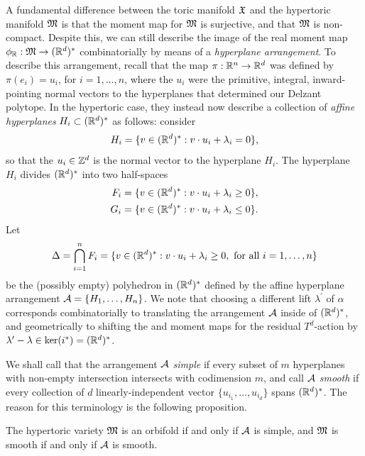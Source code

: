 A fundamental difference between the toric manifold $\mathfrak{X}$ and the hypertoric manifold $\mathfrak{M}$ is that the \HK moment map for $\mathfrak{M}$ is surjective, and that $\mathfrak{M}$ is non-compact. Despite this, we can still describe the image of the real moment map $\phi_{\mathbb{R}}:\mathfrak{M}\rightarrow (\mathbb{R}^{d})^{\ast}$ combinatorially by means of a \emph{hyperplane arrangement}. To describe this arrangement, recall that the map $\pi:\mathbb{R}^{n}\rightarrow \mathbb{R}^{d}$ was defined by $\pi(e_{i}) = u_{i}$, for $i = 1,\ldots, n$, where the $u_{i}$ were the primitive, integral, inward-pointing normal vectors to the hyperplanes that determined our Delzant polytope. In the hypertoric case, they instead now describe a collection of \emph{affine hyperplanes} $H_{i} \subset (\mathbb{R}^{d})^{\ast}$ as follows: consider
$$
	H_{i} = \{ v \in (\mathbb{R}^{d})^{\ast}: v \cdot u_{i} + \lambda_{i} = 0 \},
$$
so that the $u_{i} \in \mathbb{Z}^{d}$ is the normal vector to the hyperplane $H_{i}$. The hyperplane $H_{i}$ divides $(\mathbb{R}^{d})^{\ast}$ into two half-spaces
\begin{equation*}
	\begin{split}
		F_{i} &= \{v \in (\mathbb{R}^{d})^{\ast}: v \cdot u_{i} + \lambda_{i} \geq 0\},\\
		G_{i} &= \{v \in (\mathbb{R}^{d})^{\ast} : v \cdot u_{i} + \lambda_{i} \leq 0  \}.
	\end{split}
\end{equation*} 
Let
$$
	\Delta = \bigcap_{i=1}^{n}F_{i} = \{v \in (\mathbb{R}^{d})^{\ast} : v \cdot u_{i} + \lambda_{i} \geq 0, \text{ for all } i = 1,\ldots, n  \}
$$
be the (possibly empty) polyhedron in $(\mathbb{R}^{d})^{\ast}$ defined by the affine hyperplane arrangement $\mathcal{A} = \{H_{1},\ldots, H_{n}  \}$. We note that choosing a different lift $\lambda^{\prime}$ of $\alpha$ corresponds combinatorially to translating the arrangement $\mathcal{A}$ inside of $(\mathbb{R}^{d})^{\ast}$, and geometrically to shifting the \K and \HK moment maps for the residual $T^{d}$-action by $\lambda^{\prime} - \lambda \in \ker (i^{\ast}) = (\mathbb{R}^{d})^{\ast}$.

We shall call that the arrangement $\mathcal{A}$ \emph{simple} if every subset of $m$ hyperplanes with non-empty intersection intersects with codimension $m$, and call $\mathcal{A}$ \emph{smooth} if every collection of $d$ linearly-independent vector $\{u_{i_{1}},\ldots, u_{i_{d}}  \}$ spans $(\mathbb{R}^{d})^{\ast}$. The reason for this terminology is the following proposition.

\begin{prop}
	The hypertoric variety $\mathfrak{M}$ is an orbifold if and only if $\mathcal{A}$ is simple, and $\mathfrak{M}$ is smooth if and only if $\mathcal{A}$ is smooth.
\end{prop}

